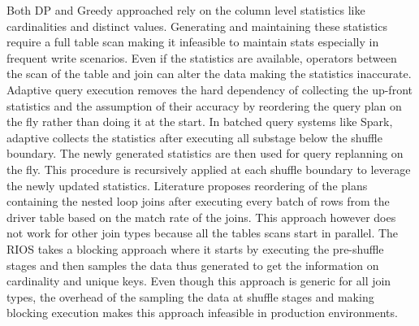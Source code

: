Both DP and Greedy approached rely on the column level statistics like cardinalities and distinct values. Generating and maintaining these statistics require a full table scan making it infeasible to maintain stats especially in frequent write scenarios. Even if the statistics are available, operators between the scan of the table and join can alter the data making the statistics inaccurate. Adaptive query execution removes the hard dependency of collecting the up-front statistics and the assumption of their accuracy by reordering the query plan on the fly rather than doing it at the start. In batched query systems like Spark, adaptive collects the statistics after executing all substage below the shuffle boundary.
The newly generated statistics are then used for query replanning on the fly. This procedure is recursively applied at each shuffle boundary to leverage the newly updated statistics. Literature \cite{b7} proposes reordering of the plans containing the nested loop joins after executing every batch of rows from the driver table based on the match rate of the joins. This approach however does not work for other join types because all the tables scans start in parallel. The  RIOS \cite{b8} takes a blocking approach where it starts by executing the pre-shuffle stages and then samples the data thus generated to get the information on cardinality and unique keys. Even though this approach is generic for all join types, the overhead of the sampling the data at shuffle stages and making blocking execution makes this approach infeasible in production environments.
